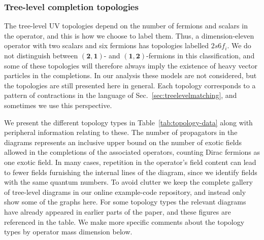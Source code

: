 \subsubsection{Tree-level completion topologies}

The tree-level UV topologies depend on the number of fermions and scalars in the
operator, and this is how we choose to label them. Thus, a dimension-eleven
operator with two scalars and six fermions has topologies labelled $2s6f_{i}$.
We do not distinguish between $(\mathbf{2}, \mathbf{1})$- and
$(\mathbf{1}, \mathbf{2})$-fermions in this classification, and some of these
topologies will therefore always imply the existence of heavy vector particles
in the completions. In our analysis these models are not considered, but the
topologies are still presented here in general. Each topology corresponds to a
pattern of contractions in the language of Sec.~\ref{sec:treelevelmatching}, and
sometimes we use this perspective.

We present the different topology types in Table~\ref{tab:topology-data} along
with peripheral information relating to these. The number of propagators in the
diagrams represents an inclusive upper bound on the number of exotic fields
allowed in the completions of the associated operators, counting Dirac fermions
as one exotic field. In many cases, repetition in the operator's field content
can lead to fewer fields furnishing the internal lines of the diagram, since we
identify fields with the same quantum numbers. To avoid clutter we keep the
complete gallery of tree-level diagrams in our online example-code repository,
and instead only show some of the graphs here. For some topology types the
relevant diagrams have already appeared in earlier parts of the paper, and these
figures are referenced in the table. We make more specific comments about the
topology types by operator mass dimension below.

